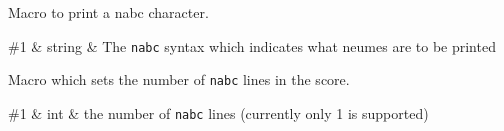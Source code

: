 Macro to print a nabc character.

\begin{argtable}
	\#1 & string & The \texttt{nabc} syntax which indicates what neumes are to be printed\\
\end{argtable}

Macro which sets the number of \texttt{nabc} lines in the score.

\begin{argtable}
	\#1 & int & the number of \texttt{nabc} lines (currently only 1 is supported)\\
\end{argtable}

